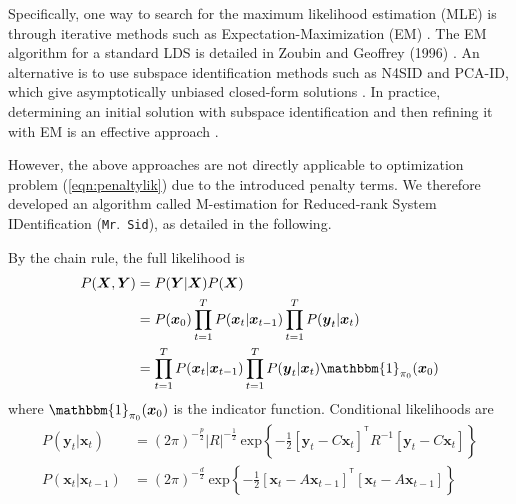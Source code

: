 \documentclass[fleqn,12pt]{article}
\let\oldref\ref
\renewcommand{\ref}[1]{(\oldref{#1})}
\newcommand{\T}{^{\ensuremath{\mathsf{T}}}}           %
\newcommand{\mrsid}{{\sc \texttt{Mr}.~\texttt{Sid}}}
\providecommand{\mb}[1]{\boldsymbol{#1}}
\newcommand{\bx}{\mb{x}}
\newcommand{\by}{\mb{y}}
\newcommand{\bX}{\mb{X}}
\newcommand{\bY}{\mb{Y}}
\begin{document}
Specifically, one way to search for the maximum likelihood estimation (MLE) is through iterative methods such as Expectation-Maximization (EM) \citep{shumway1982approach}. The EM algorithm for a standard LDS is detailed in Zoubin and Geoffrey (1996) \citep{ghahramani1996parameter}. An alternative is to use subspace identification methods such as N4SID and PCA-ID, which give asymptotically unbiased closed-form solutions \citep{van1994n4sid,doretto2003dynamic}. In practice, determining an initial solution with subspace identification and then refining it with EM is an effective approach \citep{bootslearning}.
%
%

However, the above approaches are not directly applicable to optimization problem \ref{eqn:penaltylik} due to the introduced penalty terms. We therefore developed an algorithm called M-estimation for Reduced-rank System IDentification (\mrsid), as detailed in the following.
%
%
%

By the chain rule, the full likelihood is
\begin{equation*}\label{eqn:likelihood}
\begin{aligned}
P(\bX,\bY)&=P(\bY|\bX) P(\bX)\\
&= P(\bx_0)\prod\limits_{t=1}^{T}P(\bx_t|\bx_{t-1})\prod\limits_{t=1}^{T} P(\by_t|\bx_t)\\&=\prod\limits_{t=1}^{T}P(\bx_t|\bx_{t-1})\prod\limits_{t=1}^{T} P(\by_t|\bx_t)\mathbbm{1}_{\mathbf{\pi}_0}(\bx_0)
\end{aligned}
\end{equation*}
where $\mathbbm{1}_{\mathbf{\pi}_0}(\bx_0)$ is the indicator function. Conditional likelihoods are
\begin{equation*}\label{eqn:condlik}
\begin{aligned}
P(\by_t|\bx_t)&= (2\pi)^{-\frac{p}{2}}|R|^{-\frac{1}{2}}\  \text{exp}\left\{-\frac{1}{2}[\by_t-C\bx_t]^{\T}R^{-1}[\by_t-C\bx_t]\right\}\\
P(\bx_t|\bx_{t-1})
&=(2\pi)^{-\frac{d}{2}}\  \text{exp}\left\{-\frac{1}{2}[\bx_t-A\bx_{t-1}]^{\T}[\bx_t-A\bx_{t-1}]\right\}
\end{aligned}
\end{equation*}
\end{document}
